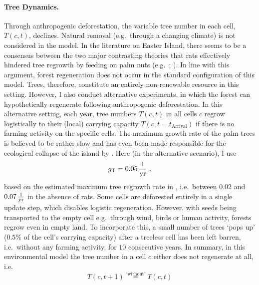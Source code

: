 \paragraph{Tree Dynamics.}
Through anthropogenic deforestation, the variable tree number in each cell, $T(c,t)$, declines.
Natural removal (e.g.\ through a changing climate) is not considered in the model.
In the literature on Easter Island, there seems to be a consensus between the two major contrasting theories that rats effectively hindered tree regrowth by feeding on palm nuts (e.g.\ ; ).
In line with this argument, forest regeneration does not occur in the standard configuration of this model.
Trees, therefore, constitute an entirely non-renewable resource in this setting. 
However, I also conduct alternative experiments, in which the forest can hypothetically regenerate following anthropogenic deforestation.
In this alternative setting, each year, tree numbers $T(c,t)$ in all cells $c$ regrow logistically to their (local) carrying capacity $T(c,t=t_\text{Arrival})$ if there is no farming activity on the specific cells.
The maximum growth rate of the palm trees is believed to be rather slow and has even been made responsible for the ecological collapse of the island by \citet{Brander1998}.
Here (in the alternative scenario), I use
\begin{equation}
g_{\rm T} = 0.05\, {\rm \frac{1}{yr}} \ ,
\end{equation}
based on the estimated maximum tree regrowth rate in \citet{Brandt2015}, i.e.\ between $0.02$ and $0.07\, {\rm \frac{1}{yr}}$ in the absence of rats.
Some cells are deforested entirely in a single update step, which disables logistic regeneration. 
However, with seeds being transported to the empty cell e.g.\ through wind, birds or human activity, forests regrow even in empty land.
To incorporate this, a small number of trees `pops up' ($0.5\%$ of the cell's carrying capacity) after a treeless cell has been left barren, i.e.\ without any farming activity, for $10$ consecutive years.
In summary, in this environmental model the tree number in a cell $c$ either does not regenerate at all, i.e.\ 
\begin{equation}
T(c,t+1) \stackrel{\text{`without'}}{=} T(c,t)
\end{equation}
